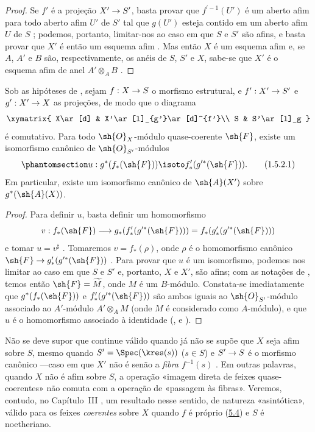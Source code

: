 \documentclass[oneside,10pt]{amsart}
\makeatletter
\newcommand{\ega@arrow}[2]{\mathchoice{#1}{#2}{#2}{#2}}
\renewcommand{\to}{\ega@arrow{\longrightarrow}{\rightarrow}}
\newcommand{\oldpage}[2][]{\marginnote{\normalfont\footnotesize\textbf{#1}~|~#2}\ignorespaces}
\let\EGAOriginalLabel\label
\renewcommand{\label}[1]{\phantomsection\EGAOriginalLabel{#1}}
\makeatother
\begin{document}
\begin{proof}
Se $f'$ é a projeção $X'\to S'$, basta provar que $f^{\prime-1}(U')$ é um aberto afim para todo aberto afim $U'$ de $S'$ tal que $g(U')$ esteja contido em um aberto afim $U$ de $S$ ; podemos, portanto, limitar-nos ao caso em que $S$ e $S'$ são afins, e basta provar que $X'$ é então um esquema afim .
Mas então $X$ é um esquema afim  e, se $A$, $A'$ e $B$ são, respectivamente, os anéis de $S$, $S'$ e $X$, sabe-se que $X'$ é o esquema afim de anel $A'\otimes_A B$ .
\end{proof}

\begin{corollary}[1.5.2]
\label{II.1.5.2}
Sob as hipóteses de , sejam $f:X\to S$ o morfismo estrutural, e $f':X'\to S'$ e $g':X'\to X$ as projeções, de modo que o diagrama
\[
  \xymatrix{
    X\ar[d] &
    X'\ar[l]_{g'}\ar[d]^{f'}\\
    S &
    S'\ar[l]_g
  }
\]
é comutativo.
Para todo $\sh{O}_X$-módulo quase-coerente $\sh{F}$, existe um isomorfismo canônico de $\sh{O}_{S'}$-módulos
\[
\label{II.1.5.2.1}
  u:g^*(f_*(\sh{F}))\isoto f'_*(g^{\prime*}(\sh{F})).
  \tag{1.5.2.1}
\]
Em particular, existe um isomorfismo canônico de $\sh{A}(X')$ sobre $g^*(\sh{A}(X))$.
\end{corollary}

\begin{proof}
Para definir $u$, basta definir um homomorfismo
\[
  v:f_*(\sh{F})\to
  g_*(f'_*(g^{\prime*}(\sh{F})))
  =f_*(g'_*(g^{\prime*}(\sh{F})))
\]
e tomar $u=v^\sharp$ .
Tomaremos $v=f_*(\rho)$, onde $\rho$ é o homomorfismo canônico $\sh{F}\to g'_*(g^{\prime*}(\sh{F}))$ .
Para provar que $u$ é um isomorfismo, podemos nos limitar ao caso em que $S$ e $S'$ e, portanto, $X$ e $X'$, são afins; com as notações de , temos então $\sh{F}=\widetilde{M}$, onde $M$ é um $B$-módulo.
Constata-se imediatamente que $g^*(f_*(\sh{F}))$ e $f'_*(g^{\prime*}(\sh{F}))$ são ambos iguais ao $\sh{O}_{S'}$-módulo associado ao $A'$-módulo $A'\otimes_A M$ (onde $M$ é considerado como $A$-módulo), e que $u$ é o homomorfismo associado à identidade (,  e ).
\end{proof}

\begin{remark}[1.5.3]
\label{II.1.5.3}
Não se deve supor que  continue válido quando já não se supõe que $X$ seja afim sobre $S$, mesmo quando $S'=\Spec(\kres(s))$ ($s\in S$) e $S'\to S$ é o morfismo canônico ---caso em que $X'$ não é senão a \emph{fibra $f^{-1}(s)$} .
Em outras palavras, quando $X$ não é afim sobre $S$, a operação
\oldpage[II]{13}
«imagem direta de feixes quase-coerentes» não comuta com a operação de «passagem às fibras».
Veremos, contudo, no Capítulo~III , um resultado nesse sentido, de natureza «asintótica», válido para os feixes \emph{coerentes} sobre $X$ quando $f$ é próprio (\hyperref[subsection:II.5.4]{5.4}) e $S$ é noetheriano.
\end{remark}
\end{document}
